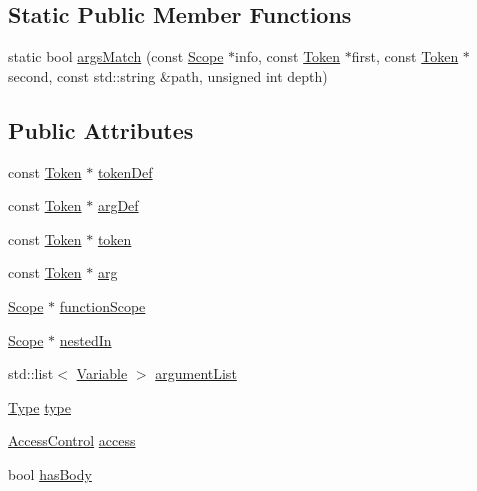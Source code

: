 \subsection*{Static Public Member Functions}
\begin{DoxyCompactItemize}
\item 
static bool \hyperlink{class_function_ac091d20230fb8812eee68a6e528e4749}{args\-Match} (const \hyperlink{class_scope}{Scope} $\ast$info, const \hyperlink{class_token}{Token} $\ast$first, const \hyperlink{class_token}{Token} $\ast$second, const std\-::string \&path, unsigned int depth)
\end{DoxyCompactItemize}
\subsection*{Public Attributes}
\begin{DoxyCompactItemize}
\item 
const \hyperlink{class_token}{Token} $\ast$ \hyperlink{class_function_ad3b10c81ba3539978da1a77a3ac12f12}{token\-Def}
\item 
const \hyperlink{class_token}{Token} $\ast$ \hyperlink{class_function_a31b432f7594922741cf4235e21ffd56e}{arg\-Def}
\item 
const \hyperlink{class_token}{Token} $\ast$ \hyperlink{class_function_ab3eb51a75e972604e5971dbe60ffee49}{token}
\item 
const \hyperlink{class_token}{Token} $\ast$ \hyperlink{class_function_abdee3005ea57c01a14996eac8b6be915}{arg}
\item 
\hyperlink{class_scope}{Scope} $\ast$ \hyperlink{class_function_a6673ca3db09fd6aa422400f3400a9ba5}{function\-Scope}
\item 
\hyperlink{class_scope}{Scope} $\ast$ \hyperlink{class_function_af903e951dc2920b6c0a19da1027cd6f9}{nested\-In}
\item 
std\-::list$<$ \hyperlink{class_variable}{Variable} $>$ \hyperlink{class_function_ae0dd1fb41d8a7591aeadc3367909a414}{argument\-List}
\item 
\hyperlink{class_function_ae5299683e0645400588dfad5df29c52e}{Type} \hyperlink{class_function_a4f098039aa353ddb8c0544945a248dbf}{type}
\item 
\hyperlink{symboldatabase_8h_a2e9a0288e6c2df2ecebc50944c3ff9fa}{Access\-Control} \hyperlink{class_function_a14053d43d3bc832afaf4ed1ba1994102}{access}
\item 
bool \hyperlink{class_function_a700e6bf0d7029918037c7dace89a94b0}{has\-Body}
\item 

\end{DoxyCompactItemize}
